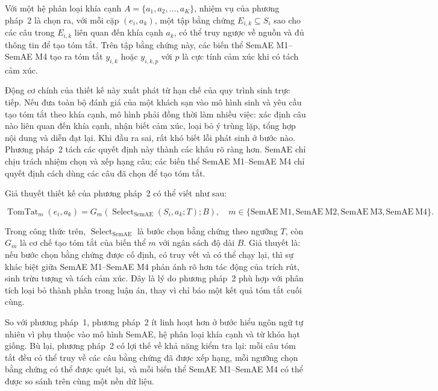 Với một hệ phân loại khía cạnh \(A=\{a_1,a_2,\ldots,a_K\}\), nhiệm vụ của phương pháp~2 là chọn ra, với mỗi cặp \((e_i,a_k)\), một tập bằng chứng \(E_{i,k}\subseteq S_i\) sao cho các câu trong \(E_{i,k}\) liên quan đến khía cạnh \(a_k\), có thể truy ngược về nguồn và đủ thông tin để tạo tóm tắt. Trên tập bằng chứng này, các biến thể SemAE M1--SemAE M4 tạo ra tóm tắt \(y_{i,k}\) hoặc \(y_{i,k,p}\) với \(p\) là cực tính cảm xúc khi có tách cảm xúc.

Động cơ chính của thiết kế này xuất phát từ hạn chế của quy trình sinh trực tiếp. Nếu đưa toàn bộ đánh giá của một khách sạn vào mô hình sinh và yêu cầu tạo tóm tắt theo khía cạnh, mô hình phải đồng thời làm nhiều việc: xác định câu nào liên quan đến khía cạnh, nhận biết cảm xúc, loại bỏ ý trùng lặp, tổng hợp nội dung và diễn đạt lại. Khi đầu ra sai, rất khó biết lỗi phát sinh ở bước nào. Phương pháp~2 tách các quyết định này thành các khâu rõ ràng hơn. SemAE chỉ chịu trách nhiệm chọn và xếp hạng câu; các biến thể SemAE M1--SemAE M4 chỉ quyết định cách dùng các câu đã chọn để tạo tóm tắt.

Giả thuyết thiết kế của phương pháp~2 có thể viết như sau:

\begin{equation}
\operatorname{TomTat}_{m}(e_i,a_k)
=
G_m\left(
\operatorname{Select}_{\mathrm{SemAE}}(S_i,a_k;T)
;B
\right),
\quad m\in\{\mathrm{SemAE\ M1},\mathrm{SemAE\ M2},\mathrm{SemAE\ M3},\mathrm{SemAE\ M4}\}.
\label{eq:method2-design-hypothesis}
\end{equation}

Trong công thức trên, \(\operatorname{Select}_{\mathrm{SemAE}}\) là bước chọn bằng chứng theo ngưỡng \(T\), còn \(G_m\) là cơ chế tạo tóm tắt của biến thể \(m\) với ngân sách độ dài \(B\). Giả thuyết là: nếu bước chọn bằng chứng được cố định, có truy vết và có thể chạy lại, thì sự khác biệt giữa SemAE M1--SemAE M4 phản ánh rõ hơn tác động của trích rút, sinh trừu tượng và tách cảm xúc. Đây là lý do phương pháp~2 phù hợp với phân tích loại bỏ thành phần trong luận án, thay vì chỉ báo một kết quả tóm tắt cuối cùng.

So với phương pháp~1, phương pháp~2 ít linh hoạt hơn ở bước hiểu ngôn ngữ tự nhiên vì phụ thuộc vào mô hình SemAE, hệ phân loại khía cạnh và từ khóa hạt giống. Bù lại, phương pháp~2 có lợi thế về khả năng kiểm tra lại: mỗi câu tóm tắt đều có thể truy về các câu bằng chứng đã được xếp hạng, mỗi ngưỡng chọn bằng chứng có thể được quét lại, và mỗi biến thể SemAE M1--SemAE M4 có thể được so sánh trên cùng một nền dữ liệu.


